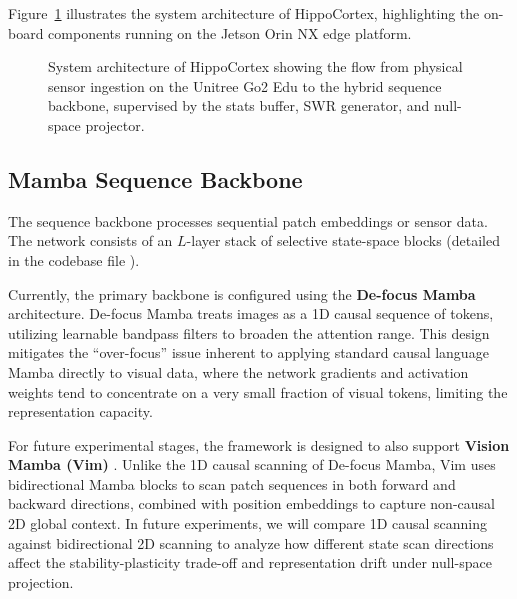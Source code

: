 Figure~\ref{fig:system_architecture} illustrates the system architecture of HippoCortex, highlighting the on-board components running on the Jetson Orin NX edge platform.

\begin{figure}[ht]
    \centering
    
    \caption{System architecture of HippoCortex showing the flow from physical sensor ingestion on the Unitree Go2 Edu to the hybrid sequence backbone, supervised by the stats buffer, SWR generator, and null-space projector.}
    \label{fig:system_architecture}
\end{figure}

\subsection{Mamba Sequence Backbone}
The sequence backbone processes sequential patch embeddings or sensor data. The network consists of an $L$-layer stack of selective state-space blocks (detailed in the codebase file \allowbreak{}\allowbreak{}). 

Currently, the primary backbone is configured using the \textbf{De-focus Mamba} \cite{taoLearning1DCausal} architecture. De-focus Mamba treats images as a 1D causal sequence of tokens, utilizing learnable bandpass filters to broaden the attention range. This design mitigates the ``over-focus'' issue inherent to applying standard causal language Mamba directly to visual data, where the network gradients and activation weights tend to concentrate on a very small fraction of visual tokens, limiting the representation capacity. 

For future experimental stages, the framework is designed to also support \textbf{Vision Mamba (Vim)} \cite{zhuVisionMambaEfficient2024}. Unlike the 1D causal scanning of De-focus Mamba, Vim uses bidirectional Mamba blocks to scan patch sequences in both forward and backward directions, combined with position embeddings to capture non-causal 2D global context. In future experiments, we will compare 1D causal scanning against bidirectional 2D scanning to analyze how different state scan directions affect the stability-plasticity trade-off and representation drift under null-space projection.

